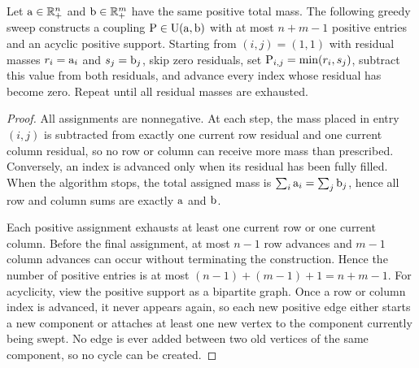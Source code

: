 \begin{prop}\label{prop-northwest-corner}
	Let $\a\in\RR_+^n$ and $\b\in\RR_+^m$ have the same positive total mass. The following greedy sweep constructs a coupling $\P\in\CouplingsD(\a,\b)$ with at most $n+m-1$ positive entries and an acyclic positive support. Starting from $(i,j)=(1,1)$ with residual masses $r_i=\a_i$ and $s_j=\b_j$, skip zero residuals, set $\P_{i,j}=\min(r_i,s_j)$,
	subtract this value from both residuals, and advance every index whose residual has become zero. Repeat until all residual masses are exhausted.
\end{prop}
\begin{proof}
	All assignments are nonnegative. At each step, the mass placed in entry $(i,j)$ is subtracted from exactly one current row residual and one current column residual, so no row or column can receive more mass than prescribed. Conversely, an index is advanced only when its residual has been fully filled. When the algorithm stops, the total assigned mass is $\sum_i \a_i=\sum_j \b_j$, hence all row and column sums are exactly $\a$ and $\b$.

	Each positive assignment exhausts at least one current row or one current column. Before the final assignment, at most $n-1$ row advances and $m-1$ column advances can occur without terminating the construction. Hence the number of positive entries is at most $(n-1)+(m-1)+1=n+m-1$. For acyclicity, view the positive support as a bipartite graph. Once a row or column index is advanced, it never appears again, so each new positive edge either starts a new component or attaches at least one new vertex to the component currently being swept. No edge is ever added between two old vertices of the same component, so no cycle can be created.
\end{proof}

